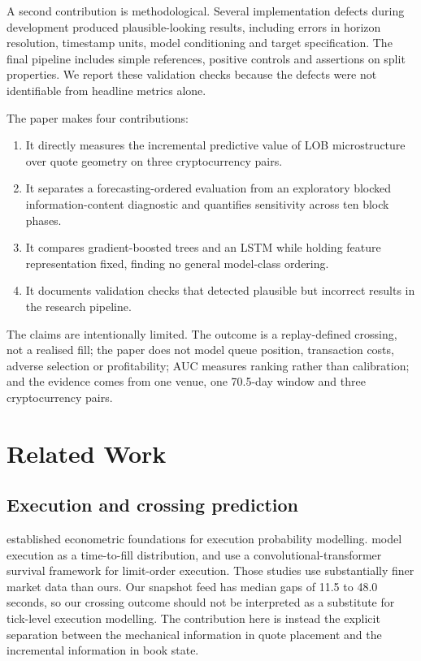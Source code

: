 \documentclass[11pt]{article}
\begin{document}
A second contribution is methodological. Several implementation defects during
development produced plausible-looking results, including errors in horizon
resolution, timestamp units, model conditioning and target specification. The
final pipeline includes simple references, positive controls and assertions on
split properties. We report these validation checks because the defects were
not identifiable from headline metrics alone.

The paper makes four contributions:
\begin{enumerate}[itemsep=2pt,topsep=4pt]
\item It directly measures the incremental predictive value of LOB
microstructure over quote geometry on three cryptocurrency pairs.
\item It separates a forecasting-ordered evaluation from an exploratory blocked
information-content diagnostic and quantifies sensitivity across ten block
phases.
\item It compares gradient-boosted trees and an LSTM while holding feature
representation fixed, finding no general model-class ordering.
\item It documents validation checks that detected plausible but incorrect
results in the research pipeline.
\end{enumerate}

The claims are intentionally limited. The outcome is a replay-defined crossing,
not a realised fill; the paper does not model queue position, transaction costs,
adverse selection or profitability; AUC measures ranking rather than
calibration; and the evidence comes from one venue, one 70.5-day window and
three cryptocurrency pairs.

\section{Related Work}

\subsection{Execution and crossing prediction}

\citet{lo2002} established econometric foundations for execution probability
modelling. \citet{maglaras2022} model execution as a time-to-fill distribution,
and \citet{arroyo2024} use a convolutional-transformer survival framework for
limit-order execution. Those studies use substantially finer market data than
ours. Our snapshot feed has median gaps of 11.5 to 48.0 seconds, so our crossing
outcome should not be interpreted as a substitute for tick-level execution
modelling. The contribution here is instead the explicit separation between the
mechanical information in quote placement and the incremental information in
book state.
\end{document}
